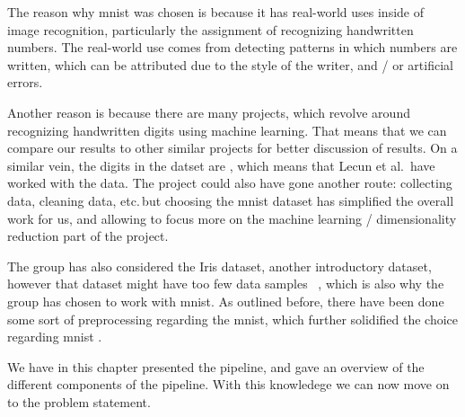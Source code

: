 The reason why \gls{mnist} was chosen is because it has real-world uses inside of image recognition, particularly the assignment of recognizing handwritten numbers. The real-world use comes from detecting patterns in which numbers are written, which can be attributed due to the style of the writer, and / or artificial errors.


Another reason is because there are many projects, which revolve around recognizing handwritten digits using machine learning. That means that we can compare our results to other similar projects for better discussion of results. On a similar vein, the digits in the datset are , which means that Lecun et al.\ have worked with the data. The project could also have gone another route: collecting data, cleaning data, etc.\,but choosing the \gls{mnist} dataset has simplified the overall work for us, and allowing to focus more on the machine learning / dimensionality reduction part of the project. 


The group has also considered the Iris dataset, another introductory dataset, however that dataset might have too few data samples ~\cite{mnist-vs-iris}, which is also why the group has chosen to work with \gls{mnist}. As outlined before, there have been done some sort of preprocessing regarding the \gls{mnist}, which further solidified the choice regarding \gls{mnist} .


We have in this chapter presented the pipeline, and gave an overview of the different components of the pipeline. With this knowledege we can now move on to the problem statement. 

